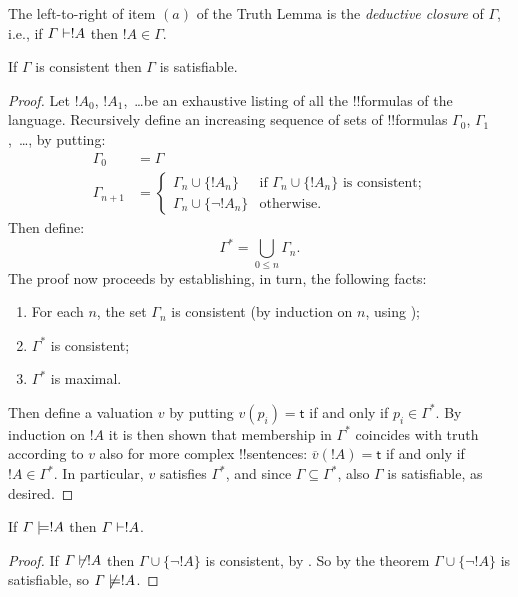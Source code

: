 \documentclass[../../include/open-logic-section]{subfiles}
\begin{document}
The left-to-right of item $(a)$ of the Truth Lemma is the
\emph{deductive closure} of $\Gamma$, i.e., if $\Gamma \Proves !A$ then $!A
\in \Gamma$.

\begin{thm}[Completeness] 
If $\Gamma$ is consistent then $\Gamma$ is satisfiable.
\end{thm}

\begin{proof} 
Let $!A_0$, $!A_1$,~\dots be an exhaustive listing of all the
!!{formula}s of the language. Recursively define an increasing
sequence of sets of !!{formula}s $\Gamma_0$, $\Gamma_1$,~\dots, by
putting: 
\begin{align*} 
\Gamma_0 & = \Gamma\\ 
\Gamma_{n+1} &  = 
\begin{cases} 
  \Gamma_n\cup\{!A_n\} & \text{if $\Gamma_n\cup\{!A_n\}$ is
    consistent;}\\ 
  \Gamma_n\cup\{\lnot!A_n\} & \text{otherwise}. 
\end{cases} 
\end{align*} 
Then define: 
\[ 
\Gamma^* = \bigcup_{0\le n}\Gamma_n.
\] 
The proof now proceeds by establishing, in turn, the following
facts: 
\begin{enumerate} 
\item For each $n$, the set $\Gamma_n$ is consistent (by induction on
  $n$, using );
\item $\Gamma^*$ is consistent; 
\item $\Gamma^*$ is maximal.
\end{enumerate} 
Then define a valuation $v$ by putting $v(p_i) = \mathsf{t}$ if and
only if $p_i \in\Gamma^*$. By induction on $!A$ it is then shown that
membership in $\Gamma^*$ coincides with truth according to $v$ also
for more complex !!{sentence}s: $\overline{v}(!A) = \mathsf{t}$ if and
only if $!A\in \Gamma^*$. In particular, $v$ satisfies $\Gamma^*$, and
since $\Gamma\subseteq \Gamma^*$, also $\Gamma$ is satisfiable, as
desired. 
\end{proof}

\begin{cor} 
If $\Gamma \Entails !A$ then $\Gamma \Proves !A$. 
\end{cor}

\begin{proof} 
If $\Gamma\Proves/ !A$ then $\Gamma\cup\{\lnot!A\}$ is consistent, by
. So by the theorem $\Gamma \cup \{\lnot !A\}$ is
satisfiable, so $\Gamma\Entails/ !A$.
\end{proof}
\end{document}
